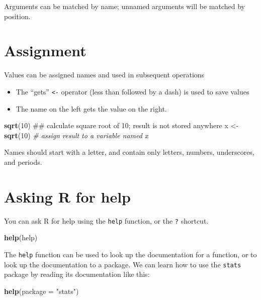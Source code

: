 \documentclass[]{book}
\newenvironment{Shaded}{\begin{snugshade}}{\end{snugshade}}
\newcommand{\KeywordTok}[1]{\textcolor[rgb]{0.13,0.29,0.53}{\textbf{#1}}}
\newcommand{\DataTypeTok}[1]{\textcolor[rgb]{0.13,0.29,0.53}{#1}}
\newcommand{\DecValTok}[1]{\textcolor[rgb]{0.00,0.00,0.81}{#1}}
\newcommand{\StringTok}[1]{\textcolor[rgb]{0.31,0.60,0.02}{#1}}
\newcommand{\CommentTok}[1]{\textcolor[rgb]{0.56,0.35,0.01}{\textit{#1}}}
\newcommand{\NormalTok}[1]{#1}
\providecommand{\tightlist}{%
  \setlength{\itemsep}{0pt}\setlength{\parskip}{0pt}}
\begin{document}
Arguments can be matched by name; unnamed arguments will be matched by
position.

\section{Assignment}\label{assignment}

Values can be assigned names and used in subsequent operations

\begin{itemize}
\tightlist
\item
  The ``gets'' \texttt{\textless{}-} operator (less than followed by a
  dash) is used to save values
\item
  The name on the left gets the value on the right.
\end{itemize}

\begin{Shaded}
\begin{Highlighting}[]
\KeywordTok{sqrt}\NormalTok{(}\DecValTok{10}\NormalTok{) ## calculate square root of 10; result is not stored anywhere}
\NormalTok{x <-}\StringTok{ }\KeywordTok{sqrt}\NormalTok{(}\DecValTok{10}\NormalTok{) }\CommentTok{# assign result to a variable named x}
\end{Highlighting}
\end{Shaded}

Names should start with a letter, and contain only letters, numbers,
underscores, and periods.

\section{Asking R for help}\label{asking-r-for-help}

You can ask R for help using the \texttt{help} function, or the
\texttt{?} shortcut.

\begin{Shaded}
\begin{Highlighting}[]
\KeywordTok{help}\NormalTok{(help)}
\end{Highlighting}
\end{Shaded}

The \texttt{help} function can be used to look up the documentation for
a function, or to look up the documentation to a package. We can learn
how to use the \texttt{stats} package by reading its documentation like
this:

\begin{Shaded}
\begin{Highlighting}[]
\KeywordTok{help}\NormalTok{(}\DataTypeTok{package =} \StringTok{"stats"}\NormalTok{)}
\end{Highlighting}
\end{Shaded}
\end{document}
